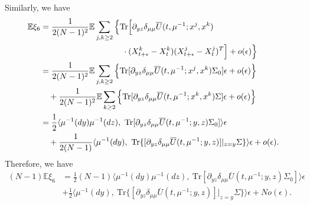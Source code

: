 \documentclass{amsart}
\theoremstyle{definition}
\theoremstyle{remark}
\def\EE{{\mathbb E}}
\numberwithin{equation}{section}
\begin{document}
Similarly, we have
\begin{align*}
\EE \xi_6&=\frac{1}{2(N-1)^2}\EE\sum_{j,k\ge 2}\Big\{ \mbox{Tr}\Big[\partial_{yz} \delta_{\mu\mu} \overline U(t,  \mu^{-1};x^j,x^k)\\
& \hskip 3.5cm \cdot (X_{t+\epsilon}^k-X_t^k)(X_{t+\epsilon}^j-X_t^j)^T\Big] +o(\epsilon)\Big\}  \\
&= \frac{1}{2(N-1)^2}\EE\sum_{j,k\ge 2}\Big\{ \mbox{Tr[}\partial_{yz} \delta_{\mu\mu} \overline U(t,  \mu^{-1};x^j,x^k) \Sigma_0]\epsilon +o(\epsilon)\Big\} \\
&\quad + \frac{1}{2(N-1)^2}\EE\sum_{k\ge 2}\Big\{ \mbox{Tr[}\partial_{yz} \delta_{\mu\mu} \overline U(t,  \mu^{-1};x^k,x^k) \Sigma] \epsilon +o(\epsilon)\Big\}\\
& = \frac12\langle\mu^{-1}(dy) \mu^{-1}(dz), \    \mbox{Tr}[\partial_{yz} \delta_{\mu\mu}\overline U(t, \mu^{-1};y,z) \Sigma_0  ]\rangle\epsilon \\
&\quad +  \frac{1}{2(N-1)}\langle\mu^{-1}(dy) , \    \mbox{Tr}\{[\partial_{yz} \delta_{\mu\mu} \overline U(t, \mu^{-1};y,z)]|_{z=y} \Sigma\}  \rangle\epsilon
+o(\epsilon).
\end{align*}
Therefore,  we have
\begin{align*}
(N-1) \EE \xi_6 &=   \frac12 (N-1)\langle\mu^{-1}(dy) \mu^{-1}(dz), \    \mbox{Tr}[\partial_{yz} \delta_{\mu\mu}\overline U(t, \mu^{-1};y,z) \Sigma_0]  \rangle\epsilon \\
& +  \frac12\langle\mu^{-1}(dy) , \    \mbox{Tr}\{[\partial_{yz} \delta_{\mu\mu} \overline U(t, \mu^{-1};y,z)]|_{z=y} \Sigma \} \rangle\epsilon
+No(\epsilon).
\end{align*}
\end{document}
